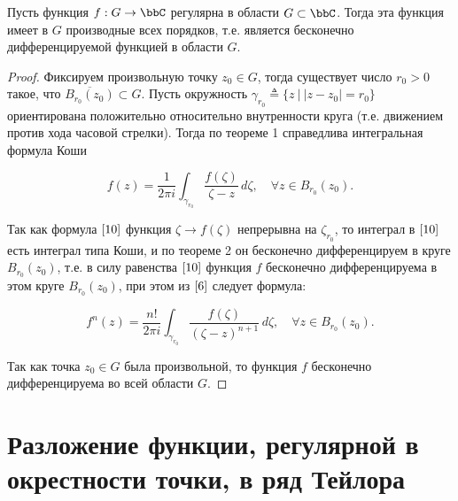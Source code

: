 \begin{thm} \label{T3}

Пусть функция $f : G \to \bbC$ регулярна в области $G \subset \bbC$. Тогда эта функция имеет в $G$ производные всех порядков, т.е. является бесконечно дифференцируемой функцией в области $G$.

\end{thm}
\begin{proof}
Фиксируем произвольную точку $z_0 \in G$, тогда существует число $r_0 > 0$ такое, что $\overline{B_{r_0}(z_0)}\subset G$. Пусть окружность $\gamma_{r_0} \triangleq \{ z \: \bigl| \: |z - z_0| = r_0 \}$ ориентирована положительно относительно внутренности круга (т.е. движением против хода часовой стрелки). Тогда по теореме 1 справедлива интегральная формула Коши

\begin{equation} \label{10}
f(z) = \frac{1}{2\pi i} \int_{\gamma_{r_0}} \frac{f(\zeta)}{\zeta - z} \,d\zeta, \quad \forall z \in B_{r_0}(z_0).
\end{equation}

Так как формула $\eqref{10}$ функция $\zeta \to f(\zeta)$ непрерывна на $\zeta_{r_0}$, то интеграл в $\eqref{10}$ есть интеграл типа Коши, и по теореме 2 он бесконечно дифференцируем в круге $B_{r_0}(z_0)$, т.е. в силу равенства $\eqref{10}$ функция $f$ бесконечно дифференцируема в этом круге $B_{r_0}(z_0)$, при этом из $\eqref{6}$ следует формула:

\begin{equation} \label{11}
f^{n}(z) = \frac{n!}{2\pi i} \int_{\gamma_{r_0}} \frac{f(\zeta)}{(\zeta - z)^{n+1}}\,d\zeta, \quad \forall z \in B_{r_0}(z_0).
\end{equation}

Так как точка $z_0 \in G$ была произвольной, то функция $f$ бесконечно дифференцируема во всей области 
$G$.
\end{proof}
\section{Разложение функции, регулярной в окрестности точки, в ряд Тейлора}